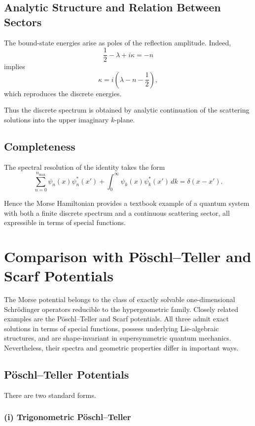 \documentclass[11pt]{article}
\begin{document}
\subsection{Analytic Structure and Relation Between Sectors}

The bound-state energies arise as poles of the reflection amplitude. Indeed,
\[
\frac12-\lambda+i\kappa = -n
\]
implies
\[
\kappa = i\left(\lambda-n-\frac12\right),
\]
which reproduces the discrete energies.

Thus the discrete spectrum is obtained by analytic continuation of the scattering solutions into the upper imaginary $k$-plane.

\subsection{Completeness}

The spectral resolution of the identity takes the form
\begin{equation}
\sum_{n=0}^{n_{\max}}
\psi_n(x)\psi_n^*(x')
+
\int_0^\infty
\psi_k(x)\psi_k^*(x')\,dk
=
\delta(x-x').
\end{equation}

Hence the Morse Hamiltonian provides a textbook example of a quantum system with both a finite discrete spectrum and a continuous scattering sector, all expressible in terms of special functions.


\section{Comparison with Pöschl--Teller and Scarf Potentials}

The Morse potential belongs to the class of exactly solvable
one-dimensional Schrödinger operators reducible to the hypergeometric
family. Closely related examples are the Pöschl--Teller and Scarf
potentials. All three admit exact solutions in terms of special
functions, possess underlying Lie-algebraic structures, and are
shape-invariant in supersymmetric quantum mechanics. Nevertheless,
their spectra and geometric properties differ in important ways.

\subsection{Pöschl--Teller Potentials}

There are two standard forms.

\subsubsection*{(i) Trigonometric Pöschl--Teller}
\end{document}
